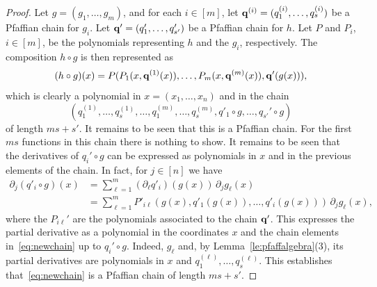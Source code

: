 \begin{proof}
Let $g=(g_1,\dots,g_m)$, and for each $i\in [m]$, let $\mathbf{q}^{(i)}=(q_1^{(i)},\dots,q_s^{(i)})$ be a Pfaffian chain for $g_i$. Let $\mathbf{q}'=(q_1',\dots,q_{s'}')$ be a Pfaffian chain for $h$. Let $P$ and $P_i$, $i\in [m]$, be the polynomials representing $h$ and the $g_i$, respectively. The composition $h\circ g$ is then represented as 
\begin{equation}\label{eq:longpoly}
 (h\circ g)(x) = P(P_1(x,\mathbf{q}^{(1)}(x)),\dots,P_m(x,\mathbf{q}^{(m)}(x)),\mathbf{q}'(g(x))),
\end{equation}
which is clearly a polynomial in $x=(x_1,\dots,x_n)$ and in the chain
\begin{equation}\label{eq:newchain}
  (q_1^{(1)},\dots,q_s^{(1)},\dots,q_1^{(m)},\dots,q_s^{(m)},q'_1\circ g,\dots,q_{s'}'\circ g)
\end{equation}
of length $ms+s'$. It remains to be seen that this is a Pfaffian chain. For the first $ms$ functions in this chain there is nothing to show. It remains to be seen that the derivatives of $q_i'\circ g$ can be expressed as polynomials in $x$ and in the previous elements of the chain. In fact, for $j\in [n]$ we have
\begin{equation}\label{eq:composite}
\begin{aligned}
\partial_j(q'_i\circ g)(x)
&=\sum_{\ell=1}^m(\partial_\ell q'_i)(g(x))\,\partial_j g_\ell(x)\\
&=\sum_{\ell=1}^m P'_{i\ell}(g(x),q'_1(g(x)),\dots,q'_i(g(x)))\,\partial_j g_\ell(x),
\end{aligned}
\end{equation}
where the $P_{i\ell}'$ are the polynomials associated to the chain $\mathbf{q}'$. 
This expresses the partial derivative as a polynomial in the coordinates $x$ and the chain elements in~\eqref{eq:newchain} up to $q_i'\circ g$. Indeed, $g_{\ell}$ and, by Lemma~\ref{le:pfaffalgebra}(3), its partial derivatives are polynomials in $x$ and $q_1^{(\ell)},\dots,q_s^{(\ell)}$. This establishes that~\eqref{eq:newchain} is a Pfaffian chain of length $ms+s'$.


\end{proof}
